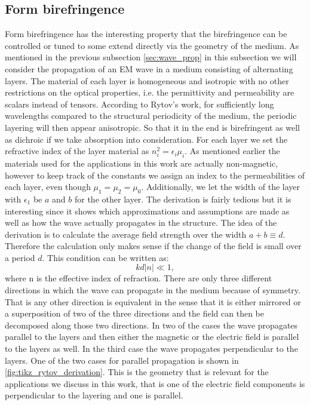 \subsection{Form birefringence}
\label{sec:form_birefringence}
Form birefringence has the interesting property that the birefringence can be controlled or tuned to some extend directly via the geometry of the medium. As mentioned in the previous subsection \ref{sec:wave_prop} in this subsection we will consider the propagation of an EM wave in a medium consisting of alternating layers. The material of each layer is homogeneous and isotropic with no other restrictions on the optical properties, i.e. the permittivity and permeability are scalars instead of tensors. According to Rytov's work, for sufficiently long wavelengths compared to the structural periodicity of the medium, the periodic layering will then appear anisotropic. So that it in the end is birefringent as well as dichroic if we take absorption into consideration. For each layer we set the refractive index of the layer material as $n_i^2 = \epsilon_i \mu_i$. As mentioned earlier the materials used for the applications in this work are actually non-magnetic, however to keep track of the constants we assign an index to the permeabilities of each layer, even though $\mu_1=\mu_2=\mu_0$. Additionally, we let the width of the layer with $\epsilon_1$ be $a$ and $b$ for the other layer. The derivation is fairly tedious but it is interesting since it shows which approximations and assumptions are made as well as how the wave actually propagates in the structure. The idea of the derivation is to calculate the average field strength over the width $a+b\equiv d$. Therefore the calculation only makes sense if the change of the field is small over a period $d$. This condition can be written as:
\begin{equation}
    \label{eq:rytov_cond1}
    kd|n|\ll 1,
\end{equation}
where n is the effective index of refraction. There are only three different directions in which the wave can propagate in the medium because of symmetry. That is any other direction is equivalent in the sense that it is either mirrored or a superposition of two of the three directions and the field can then be decomposed along those two directions. In two of the cases the wave propagates parallel to the layers and then either the magnetic or the electric field is parallel to the layers as well. In the third case the wave propagates perpendicular to the layers. One of the two cases for parallel propagation is shown in \ref{fig:tikz_rytov_derivation}. This is the geometry that is relevant for the applications we discuss in this work, that is one of the electric field components is perpendicular to the layering and one is parallel. 

